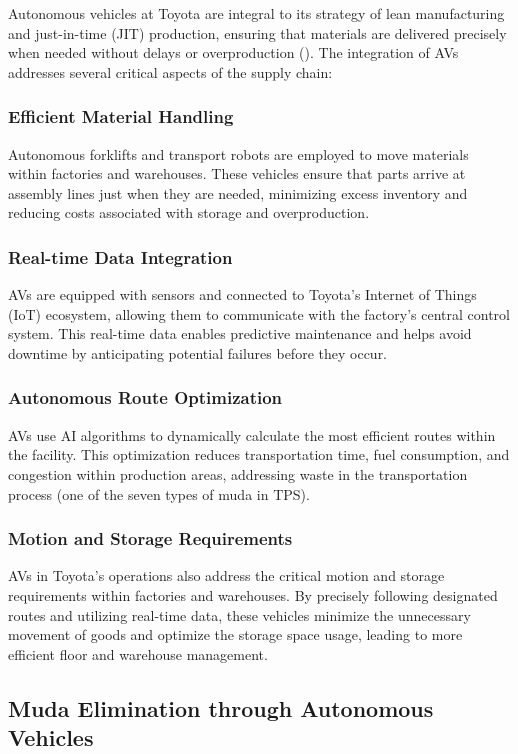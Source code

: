 Autonomous vehicles at Toyota are integral to its strategy of lean manufacturing and just-in-time (JIT) production, ensuring that materials are delivered precisely when needed without delays or overproduction (\cite{toyota_production_system}). The integration of AVs addresses several critical aspects of the supply chain:

\subsubsection{Efficient Material Handling}
Autonomous forklifts and transport robots are employed to move materials within factories and warehouses. These vehicles ensure that parts arrive at assembly lines just when they are needed, minimizing excess inventory and reducing costs associated with storage and overproduction.

\subsubsection{Real-time Data Integration}
AVs are equipped with sensors and connected to Toyota’s Internet of Things (IoT) ecosystem, allowing them to communicate with the factory’s central control system. This real-time data enables predictive maintenance and helps avoid downtime by anticipating potential failures before they occur.

\subsubsection{Autonomous Route Optimization}
AVs use AI algorithms to dynamically calculate the most efficient routes within the facility. This optimization reduces transportation time, fuel consumption, and congestion within production areas, addressing waste in the transportation process (one of the seven types of muda in TPS).

\subsubsection{Motion and Storage Requirements}
AVs in Toyota’s operations also address the critical motion and storage requirements within factories and warehouses. By precisely following designated routes and utilizing real-time data, these vehicles minimize the unnecessary movement of goods and optimize the storage space usage, leading to more efficient floor and warehouse management.

\subsection{Muda Elimination through Autonomous Vehicles}

